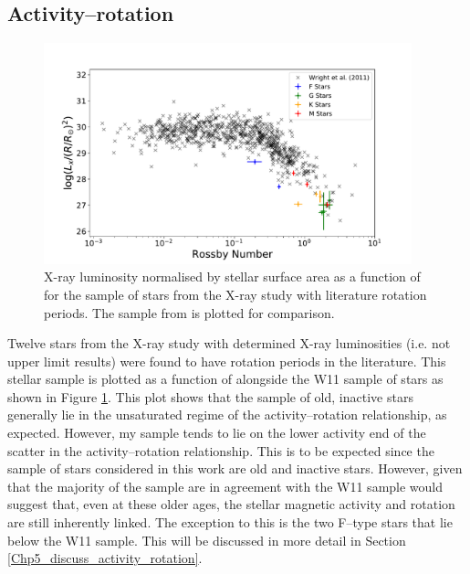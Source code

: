 \subsection{Activity--rotation}
\label{Chp5_results_activity_rotation}

\begin{figure}[!ht]
    \centering
    \includegraphics[width=0.95\textwidth]{Figures/5-Activity_rotation/lx_v_R0.pdf}
    \caption[$L_{x}$ as a function of \Ro]{X-ray luminosity normalised by stellar surface area as a function of \Ro for the sample of stars from the X-ray study with literature rotation periods. The sample from \citet{Wright_etal_2011} is plotted for comparison.}
    \label{fig:lx_v_ro}
\end{figure}

Twelve stars from the X-ray study \citep{Booth_etal_2017} with determined X-ray luminosities (i.e. not upper limit results) were found to have rotation periods in the literature. This stellar sample is plotted as a function of \Ro alongside the W11 sample of stars as shown in Figure \ref{fig:lx_v_ro}. This plot shows that the sample of old, inactive stars generally lie in the unsaturated regime of the activity--rotation relationship, as expected. However, my sample tends to lie on the lower activity end of the scatter in the activity--rotation relationship. This is to be expected since the sample of stars considered in this work are old and inactive stars. However, given that the majority of the sample are in agreement with the W11 sample would suggest that, even at these older ages, the stellar magnetic activity and rotation are still inherently linked. The exception to this is the two F--type stars that lie below the W11 sample. This will be discussed in more detail in Section \ref{Chp5_discuss_activity_rotation}.

